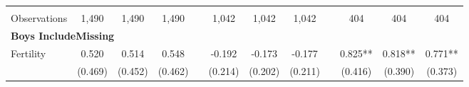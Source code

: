 \begin{landscape}
\begin{table}[htpb!]
\begin{center}
\begin{tabular}{lcccp{2mm}cccp{2mm}ccc}
\begin{footnotesize}\end{footnotesize}&\begin{footnotesize}\end{footnotesize}&\begin{footnotesize}\end{footnotesize}&\begin{footnotesize}\end{footnotesize}&\begin{footnotesize}\end{footnotesize}&\begin{footnotesize}\end{footnotesize}&\begin{footnotesize}\end{footnotesize}&\begin{footnotesize}\end{footnotesize}&\begin{footnotesize}\end{footnotesize}&\begin{footnotesize}\end{footnotesize}&\begin{footnotesize}\end{footnotesize}&\begin{footnotesize}\end{footnotesize}\\Observations&1,490&1,490&1,490&&1,042&1,042&1,042&&404&404&404\\
\multicolumn{12}{l}{\textbf{Boys IncludeMissing}}\\ 
Fertility&0.520&0.514&0.548&&-0.192&-0.173&-0.177&&0.825**&0.818**&0.771**\\
&(0.469)&(0.452)&(0.462)&&(0.214)&(0.202)&(0.211)&&(0.416)&(0.390)&(0.373)\\

\end{tabular}
\end{center}
\end{table}
\end{landscape}
